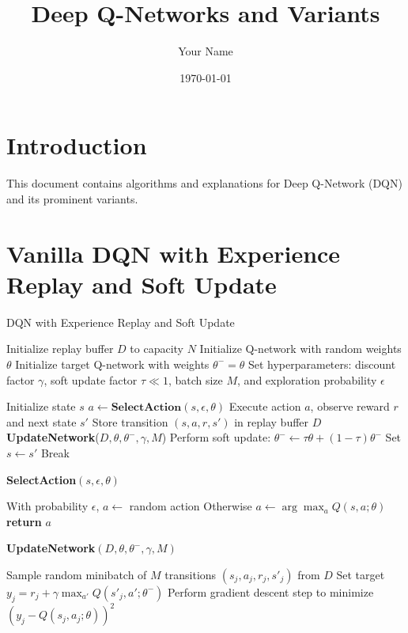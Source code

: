 \documentclass{article}
\title{Deep Q-Networks and Variants}
\author{Your Name}
\date{\today}
\begin{document}
\maketitle

\section{Introduction}

This document contains algorithms and explanations for Deep Q-Network (DQN) and its prominent variants.

\section{Vanilla DQN with Experience Replay and Soft Update}

\begin{algorithm}[H]
\caption{DQN with Experience Replay and Soft Update}
\begin{algorithmic}[1]
\STATE Initialize replay buffer $D$ to capacity $N$
\STATE Initialize Q-network with random weights $\theta$
\STATE Initialize target Q-network with weights $\theta^{-} = \theta$
\STATE Set hyperparameters: discount factor $\gamma$, soft update factor $\tau \ll 1$, batch size $M$, and exploration probability $\epsilon$

    \STATE Initialize state $s$
        \STATE $a \leftarrow \textbf{SelectAction}(s, \epsilon, \theta)$
        \STATE Execute action $a$, observe reward $r$ and next state $s'$ 
        \STATE Store transition $(s,a,r,s')$ in replay buffer $D$
        \STATE \textbf{UpdateNetwork}($D, \theta, \theta^{-}, \gamma, M$)
        \STATE Perform soft update: $\theta^{-} \leftarrow \tau \theta + (1 - \tau) \theta^{-}$
        \STATE Set $s \leftarrow s'$
            \STATE Break
        \ENDIF
    \ENDFOR
\ENDFOR

\vspace{0.5em}
\STATE \textbf{SelectAction}$(s, \epsilon, \theta)$
\begin{ALC@g}
    \STATE With probability $\epsilon$, $a \leftarrow$ random action
    \STATE Otherwise $a \leftarrow \arg\max_a Q(s,a;\theta)$
    \STATE \textbf{return} $a$
\end{ALC@g}

\vspace{0.5em}
\STATE \textbf{UpdateNetwork}$(D, \theta, \theta^{-}, \gamma, M)$
\begin{ALC@g}
    \STATE Sample random minibatch of $M$ transitions $(s_j,a_j,r_j,s'_j)$ from $D$
    \STATE Set target $y_j = r_j + \gamma \max_{a'}Q(s'_j, a'; \theta^{-})$
    \STATE Perform gradient descent step to minimize $(y_j - Q(s_j, a_j; \theta))^2$
\end{ALC@g}

\end{algorithmic}
\end{algorithm}
\end{document}
